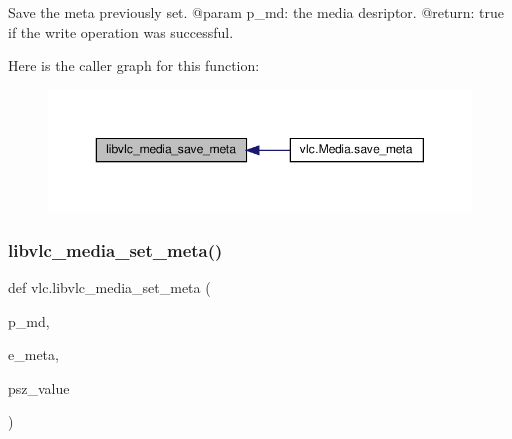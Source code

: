 \begin{DoxyVerb}Save the meta previously set.
@param p_md: the media desriptor.
@return: true if the write operation was successful.
\end{DoxyVerb}
 Here is the caller graph for this function\+:
\nopagebreak
\begin{figure}[H]
\begin{center}
\leavevmode
\includegraphics[width=350pt]{namespacevlc_ad95c7299c647fa68384b974e4561f9b4_icgraph}
\end{center}
\end{figure}
\mbox{\label{namespacevlc_aaef688f523878755ccf5425b1c5ea3a1}} 
\subsubsection{\texorpdfstring{libvlc\+\_\+media\+\_\+set\+\_\+meta()}{libvlc\_media\_set\_meta()}}
{\footnotesize\ttfamily def vlc.\+libvlc\+\_\+media\+\_\+set\+\_\+meta (\begin{DoxyParamCaption}\item[{}]{p\+\_\+md,  }\item[{}]{e\+\_\+meta,  }\item[{}]{psz\+\_\+value }\end{DoxyParamCaption})}

